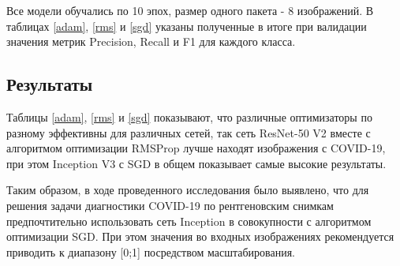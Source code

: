 Все модели обучались по 10 эпох, размер одного пакета ­- 8 изображений. В таблицах \ref{adam}, \ref{rms} и \ref{sgd} указаны полученные в итоге при валидации значения метрик Precision, Recall и F1 для каждого класса.





\subsection{Результаты}
Таблицы \ref{adam}, \ref{rms} и \ref{sgd} показывают, что различные оптимизаторы по разному эффективны для различных сетей, так сеть ResNet-50 V2 вместе с алгоритмом оптимизации RMSProp лучше находят изображения с COVID-19, при этом Inception V3 с SGD в общем показывает самые высокие результаты. 

Таким образом, в ходе проведенного исследования было выявлено, что для решения задачи диагностики COVID-19 по рентгеновским снимкам предпочтительно использовать сеть Inception в совокупности с алгоритмом оптимизации SGD. При этом значения во входных изображениях рекомендуется приводить к диапазону [0;1] посредством масштабирования. 




\clearpage